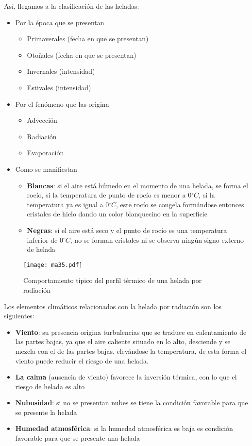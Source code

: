         Así, llegamos a la clasificación de las heladas:
        \begin{itemize}
            \item Por la época que se presentan \begin{itemize}
                \item Primaverales (fecha en que se presentan)
                \item Otoñales (fecha en que se presentan)
                \item Invernales (intensidad)
                \item Estivales (intensidad)
            \end{itemize}
            \item Por el fenómeno que las origina \begin{itemize}
                \item Advección
                \item Radiación
                \item Evaporación
        \end{itemize}
        \item Como se manifiestan \begin{itemize}
            \item \textbf{Blancas}: si el aire está húmedo en el momento de una helada, se forma el rocío, si la temperatura de punto de rocío es menor a 0$^{\circ}C$, si la temperatura ya es igual a 0$^{\circ}C$, este rocío se congela formándose entonces cristales de hielo dando un color blanquecino en la superficie
            \item \textbf{Negras}: si el aire está seco y el punto de rocío es una temperatura inferior de 0$^{\circ}C$, no se forman cristales ni se observa ningún signo externo de helada
        \end{itemize}
        \end{itemize}
        \begin{figure}[h!]
        \centering
          \texttt{[image: ma35.pdf]}
          \caption{Comportamiento típico del perfil térmico de una helada por radiación}
          \label{ma35}
        \end{figure}
        Los elementos climáticos relacionados con la helada por radiación son los siguientes:
        \begin{itemize}
            \item \textbf{Viento}: su presencia origina turbulencias que se traduce en calentamiento de las partes bajas, ya que el aire caliente situado en lo alto, desciende y se mezcla con el de las partes bajas, elevándose la temperatura, de esta forma el viento puede reducir el riesgo de una helada.
            \item \textbf{La calma} (ausencia de viento) favorece la inversión térmica, con lo que el riesgo de helada es alto
            \item \textbf{Nubosidad}: si no se presentan nubes se tiene la condición favorable para que se presente la helada
            \item \textbf{Humedad atmosférica}: si la humedad atmosférica es baja es condición favorable para que se presente una helada
        \end{itemize}
